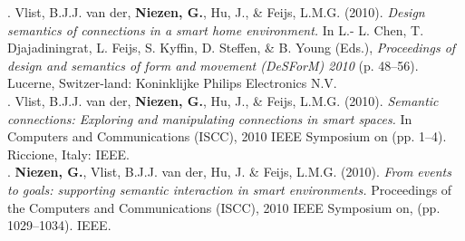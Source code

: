 . Vlist, B.J.J. van der, \textbf{Niezen, G.}, Hu, J., \& Feijs, L.M.G. (2010). \emph{Design semantics of connections in a smart home environment.} In L.- L. Chen, T. Djajadiningrat, L. Feijs, S. Kyffin, D. Steffen, \&  B. Young (Eds.), \emph{Proceedings of design and semantics of form and movement (DeSForM) 2010} (p. 48--56). Lucerne, Switzer-land: Koninklijke Philips Electronics N.V.\\

. Vlist, B.J.J. van der, \textbf{Niezen, G.}, Hu, J., \& Feijs, L.M.G. (2010). \emph{Semantic connections: Exploring and manipulating connections in smart spaces.} In Computers and Communications (ISCC), 2010 IEEE Symposium on (pp. 1--4). Riccione, Italy: IEEE.\\

. \textbf{Niezen, G.}, Vlist, B.J.J. van der, Hu, J. \& Feijs, L.M.G. (2010). \emph{From events to goals: supporting semantic interaction in smart environments.} Proceedings of the Computers and Communications (ISCC), 2010 IEEE Symposium on, (pp. 1029--1034). IEEE.\\


